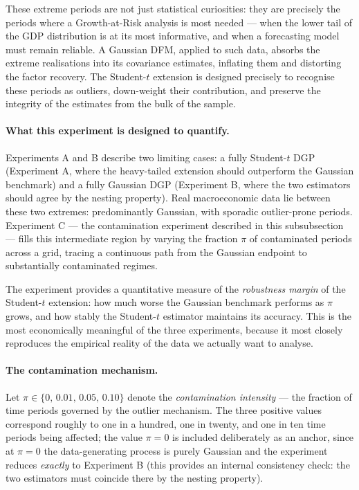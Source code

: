 \documentclass[11pt, a4paper, oneside]{article}
\begin{document}
These extreme periods are not just statistical curiosities: they
are precisely the periods where a Growth-at-Risk analysis is most
needed — when the lower tail of the GDP distribution is at its
most informative, and when a forecasting model must remain
reliable. A Gaussian DFM, applied to such data, absorbs the
extreme realisations into its covariance estimates, inflating
them and distorting the factor recovery. The Student-$t$ extension
is designed precisely to recognise these periods as outliers,
down-weight their contribution, and preserve the integrity of the
estimates from the bulk of the sample.

\paragraph{What this experiment is designed to quantify.}
Experiments A and B describe two limiting cases: a fully
Student-$t$ DGP (Experiment A, where the heavy-tailed extension
should outperform the Gaussian benchmark) and a fully Gaussian DGP
(Experiment B, where the two estimators should agree by the
nesting property). Real macroeconomic data lie between these two
extremes: predominantly Gaussian, with sporadic outlier-prone
periods. Experiment C — the contamination experiment described in
this subsubsection — fills this intermediate region by varying
the fraction $\pi$ of contaminated periods across a grid, tracing
a continuous path from the Gaussian endpoint to substantially
contaminated regimes.

The experiment provides a quantitative measure of the
\emph{robustness margin} of the Student-$t$ extension: how much
worse the Gaussian benchmark performs as $\pi$ grows, and how
stably the Student-$t$ estimator maintains its accuracy. This is
the most economically meaningful of the three experiments,
because it most closely reproduces the empirical reality of the
data we actually want to analyse.

\paragraph{The contamination mechanism.}
Let $\pi \in \{0,\, 0.01,\, 0.05,\, 0.10\}$ denote the
\emph{contamination intensity} --- the fraction of time periods
governed by the outlier mechanism. The three positive values
correspond roughly to one in a hundred, one in twenty, and one in
ten time periods being affected; the value $\pi = 0$ is included
deliberately as an anchor, since at $\pi = 0$ the data-generating
process is purely Gaussian and the experiment reduces \emph{exactly}
to Experiment B (this provides an internal consistency check: the
two estimators must coincide there by the nesting property). 
\end{document}
